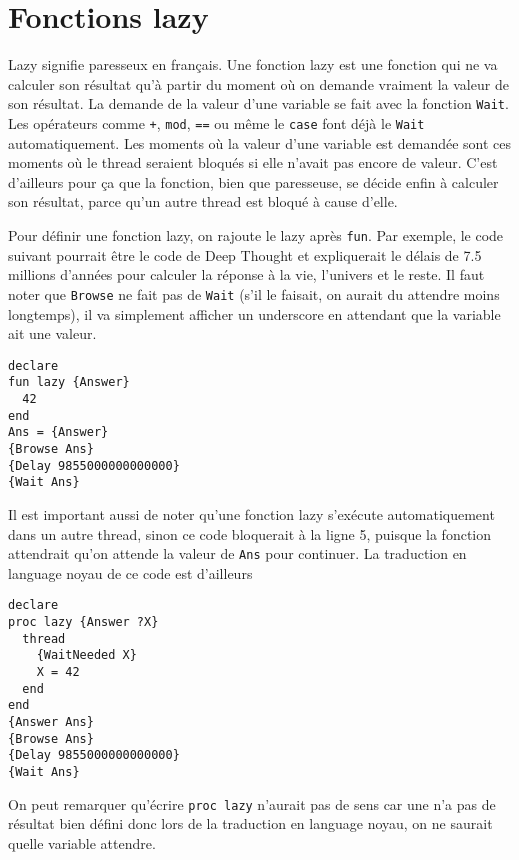 \section{Fonctions lazy}
Lazy signifie paresseux en français.
Une fonction lazy est une fonction qui ne va calculer son résultat qu'à partir du moment où on demande vraiment la valeur de son résultat.
La demande de la valeur d'une variable se fait avec la fonction \lstinline|Wait|.
Les opérateurs comme \lstinline|+|, \lstinline|mod|, \lstinline|==| ou même le \lstinline|case| font déjà le \lstinline|Wait| automatiquement.
Les moments où la valeur d'une variable est demandée sont ces moments où le thread seraient bloqués si elle n'avait pas encore de valeur.
C'est d'ailleurs pour ça que la fonction, bien que paresseuse, se décide enfin à calculer son résultat, parce qu'un autre thread est bloqué à cause d'elle.

Pour définir une fonction lazy, on rajoute le \keyword{} lazy après \lstinline|fun|.
Par exemple, le code suivant pourrait être le code de Deep Thought et expliquerait le délais de 7.5 millions d'années pour calculer
la réponse à la vie, l'univers et le reste.
Il faut noter que \lstinline|Browse| ne fait pas de \lstinline|Wait| (s'il le faisait, on aurait du attendre moins longtemps),
il va simplement afficher un underscore en attendant que la variable ait une valeur.
\begin{lstlisting}
declare
fun lazy {Answer}
  42
end
Ans = {Answer}
{Browse Ans}
{Delay 9855000000000000}
{Wait Ans}
\end{lstlisting}

Il est important aussi de noter qu'une fonction lazy s'exécute automatiquement dans un autre thread, sinon
ce code bloquerait à la ligne 5, puisque la fonction attendrait qu'on attende la valeur de \lstinline|Ans| pour continuer.
La traduction en language noyau de ce code est d'ailleurs
\begin{lstlisting}
declare
proc lazy {Answer ?X}
  thread
    {WaitNeeded X}
    X = 42
  end
end
{Answer Ans}
{Browse Ans}
{Delay 9855000000000000}
{Wait Ans}
\end{lstlisting}

On peut remarquer qu'écrire \lstinline|proc lazy| n'aurait pas de sens car une n'a pas de résultat bien défini donc lors de la traduction
en language noyau, on ne saurait quelle variable attendre.

